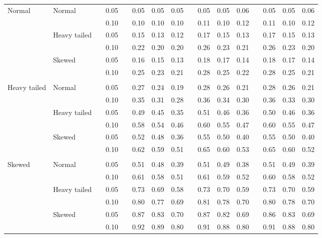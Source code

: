 \begin{table}[ht]
\begin{scriptsize}
\begin{center}
\begin{tabular}{ll p{.1cm} c p{.1cm} rrr p{.1cm} rrr p{.1cm} rrr}
\rowcolor{gray!20} Normal       & Normal       && 0.05 &&   0.05 & 0.05 & 0.05 && 0.05 & 0.05 & 0.06 && 0.05 & 0.05 & 0.06 \\ 
\rowcolor{gray!20}             &              && 0.10 &&   0.10 & 0.10 & 0.10 && 0.11 & 0.10 & 0.12 && 0.11 & 0.10 & 0.12 \\ 
\rowcolor{gray!20}             & Heavy tailed && 0.05 &&   0.15 & 0.13 & 0.12 && 0.17 & 0.15 & 0.13 && 0.17 & 0.15 & 0.13 \\ 
\rowcolor{gray!20}             &              && 0.10 &&   0.22 & 0.20 & 0.20 && 0.26 & 0.23 & 0.21 && 0.26 & 0.23 & 0.20 \\ 
\rowcolor{gray!20}             & Skewed       && 0.05 &&   0.16 & 0.15 & 0.13 && 0.18 & 0.17 & 0.14 && 0.18 & 0.17 & 0.14 \\ 
\rowcolor{gray!20}             &              && 0.10 &&   0.25 & 0.23 & 0.21 && 0.28 & 0.25 & 0.22 && 0.28 & 0.25 & 0.21 \\ 
             &&&&&&&&&&&&&&&\\
Heavy tailed & Normal       && 0.05 &&   0.27 & 0.24 & 0.19 && 0.28 & 0.26 & 0.21 && 0.28 & 0.26 & 0.21 \\ 
             &              && 0.10 &&   0.35 & 0.31 & 0.28 && 0.36 & 0.34 & 0.30 && 0.36 & 0.33 & 0.30 \\ 
             & Heavy tailed && 0.05 &&   0.49 & 0.45 & 0.35 && 0.51 & 0.46 & 0.36 && 0.50 & 0.46 & 0.36 \\ 
             &              && 0.10 &&   0.58 & 0.54 & 0.46 && 0.60 & 0.55 & 0.47 && 0.60 & 0.55 & 0.47 \\ 
             & Skewed       && 0.05 &&   0.52 & 0.48 & 0.36 && 0.55 & 0.50 & 0.40 && 0.55 & 0.50 & 0.40 \\ 
             &              && 0.10 &&   0.62 & 0.59 & 0.51 && 0.65 & 0.60 & 0.53 && 0.65 & 0.60 & 0.52 \\
             &&&&&&&&&&&&&&&\\ 
Skewed       & Normal       && 0.05 &&   0.51 & 0.48 & 0.39 && 0.51 & 0.49 & 0.38 && 0.51 & 0.49 & 0.39 \\ 
             &              && 0.10 &&   0.61 & 0.58 & 0.51 && 0.61 & 0.59 & 0.52 && 0.60 & 0.58 & 0.52 \\ 
             & Heavy tailed && 0.05 &&   0.73 & 0.69 & 0.58 && 0.73 & 0.70 & 0.59 && 0.73 & 0.70 & 0.59 \\ 
             &              && 0.10 &&   0.80 & 0.77 & 0.69 && 0.81 & 0.78 & 0.70 && 0.80 & 0.78 & 0.70 \\ 
             & Skewed       && 0.05 &&   0.87 & 0.83 & 0.70 && 0.87 & 0.82 & 0.69 && 0.86 & 0.83 & 0.69 \\ 
             &              && 0.10 &&   0.92 & 0.89 & 0.80 && 0.91 & 0.88 & 0.80 && 0.91 & 0.88 & 0.80 \\ 


\end{tabular}
\end{center}
\end{scriptsize}
\end{table}
